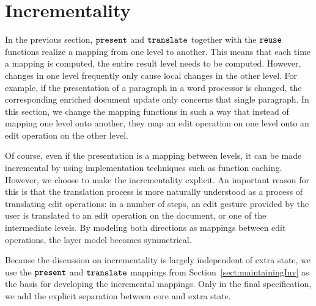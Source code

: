 



%																
\section{Incrementality} \label{sect:maintainingInc}

In the previous section, ${\tt present}$ and ${\tt translate}$ together with the ${\tt reuse}$ functions realize a mapping from one level to another. This means that each time a mapping is computed, the entire result level needs to be computed. However, changes in one level frequently only cause local changes in the other level. For example, if the presentation of a paragraph in a word processor is changed, the corresponding enriched document update only concerns that single paragraph. In this section, we change the mapping functions in such a way that instead of mapping one level onto another, they map an edit operation on one level onto an edit operation on the other level. 

Of course, even if the presentation is a mapping between levels, it can be made incremental by using implementation techniques such as function caching. However, we choose to make the incrementality explicit. An important reason for this is that the translation process is more naturally understood as a process of translating edit operations: in a number of steps, an edit gesture provided by the user is translated to an edit operation on the document, or one of the intermediate levels. By modeling both directions as mappings between edit operations, the layer model becomes symmetrical. 

Because the discussion on incrementality is largely independent of extra state, we use the ${\tt present}$ and ${\tt translate}$ mappings from Section~\ref{sect:maintainingInv} as the basis for developing the incremental mappings. Only in the final specification, we add the explicit separation between core and extra state.



